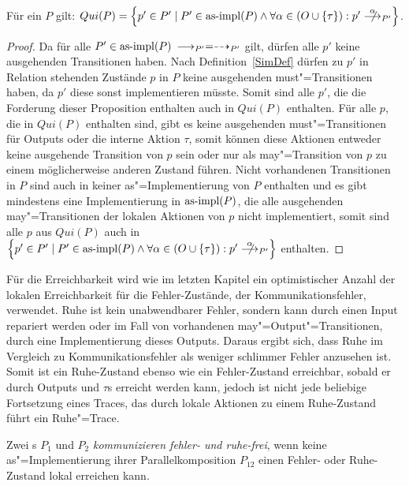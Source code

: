 \begin{Prop}
  Für ein \MEIO{} $P$ gilt: $Qui(P) = \left\{p'\in P'\mid P'\in\asimp (P)\land
  \forall\alpha\in (O\cup\{\tau\}):p' \nmust[\alpha]_{P'}\right\}$.
\end{Prop}

\begin{proof}
  Da für alle $P'\in\mathrm{as}\text{-}\mathrm{impl} (P)$ $\must_{P'} =\may_{P'}$ gilt, dürfen alle $p'$
  keine ausgehenden Transitionen haben. Nach Definition~\ref{SimDef} dürfen zu
  $p'$ in Relation stehenden Zustände $p$ in $P$ keine ausgehenden
  must"=Transitionen haben, da $p'$ diese sonst implementieren müsste. Somit
  sind alle $p'$, die die Forderung dieser Proposition enthalten auch in $Qui
  (P)$ enthalten. Für alle $p$, die in $Qui (P)$ enthalten sind, gibt es keine
  ausgehenden must"=Transitionen für Outputs oder die interne Aktion $\tau$,
  somit können diese Aktionen entweder keine ausgehende Transition von $p$ sein
  oder nur als may"=Transition von $p$ zu einem möglicherweise anderen Zustand
  führen. Nicht vorhandenen Transitionen in $P$ sind auch in keiner
  as"=Implementierung von $P$ enthalten und es gibt mindestens eine
  Implementierung in $\mathrm{as}\text{-}\mathrm{impl} (P)$, die alle ausgehenden may"=Transitionen der
  lokalen Aktionen von $p$ nicht implementiert, somit sind alle $p$ aus $Qui
  (P)$ auch in $\left\{p'\in P'\mid P'\in\asimp (P)\land \forall\alpha\in
  (O\cup\{\tau\}):p' \nmust[\alpha]_{P'}\right\}$ enthalten.
\end{proof}

Für die Erreichbarkeit wird wie im letzten Kapitel ein optimistischer Anzahl
der lokalen Erreichbarkeit für die Fehler-Zustände, der Kommunikationsfehler,
verwendet. Ruhe ist kein unabwendbarer Fehler, sondern kann durch einen Input
repariert werden oder im Fall von vorhandenen may"=Output"=Transitionen, durch
eine Implementierung dieses Outputs. Daraus ergibt sich, dass Ruhe im Vergleich
zu Kommunikationsfehler als weniger \glqq schlimmer Fehler\grqq{} anzusehen
ist. Somit ist ein Ruhe-Zustand ebenso wie ein Fehler-Zustand erreichbar,
sobald er durch Outputs und $\tau$s erreicht werden kann, jedoch ist nicht jede
beliebige Fortsetzung eines Traces, das durch lokale Aktionen zu einem
Ruhe-Zustand führt ein Ruhe"=Trace.

\begin{Def}
  Zwei \MEIO{}s $P_1$ und $P_2$ \emph{kommunizieren fehler- und ruhe-frei},
  wenn keine as"=Implementierung ihrer Parallelkomposition $P_{12}$ einen
  Fehler- oder Ruhe-Zustand lokal erreichen kann.
\end{Def}

